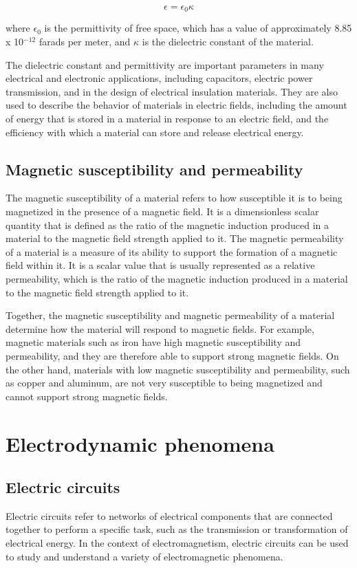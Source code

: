 \documentclass{article}
\begin{document}
$$\epsilon = \epsilon_0 \kappa$$

where $\epsilon_0$ is the permittivity of free space, which has a value of
approximately 8.85 x 10$^{-12}$ farads per meter, and $\kappa$ is the
dielectric constant of the material.

The dielectric constant and permittivity are important parameters in many
electrical and electronic applications, including capacitors, electric power
transmission, and in the design of electrical insulation materials. They are
also used to describe the behavior of materials in electric fields, including
the amount of energy that is stored in a material in response to an electric
field, and the efficiency with which a material can store and release
electrical energy.
\subsection{Magnetic susceptibility and permeability} %
\label{ssub:Magnetic susceptibility and permeability}
The magnetic susceptibility of a material refers to how susceptible it is to
being magnetized in the presence of a magnetic field. It is a dimensionless
scalar quantity that is defined as the ratio of the magnetic induction produced
in a material to the magnetic field strength applied to it. The magnetic
permeability of a material is a measure of its ability to support the formation
of a magnetic field within it. It is a scalar value that is usually represented
as a relative permeability, which is the ratio of the magnetic induction
produced in a material to the magnetic field strength applied to it.

Together, the magnetic susceptibility and magnetic permeability of a material
determine how the material will respond to magnetic fields. For example,
magnetic materials such as iron have high magnetic susceptibility and
permeability, and they are therefore able to support strong magnetic fields. On
the other hand, materials with low magnetic susceptibility and permeability,
such as copper and aluminum, are not very susceptible to being magnetized and
cannot support strong magnetic fields.

\section{Electrodynamic phenomena} %
\label{sec:Electrodynamic phenomena}
\subsection{Electric circuits} %
\label{ssub:Electric circuits}
Electric circuits refer to networks of electrical components that are connected
together to perform a specific task, such as the transmission or transformation
of electrical energy. In the context of electromagnetism, electric circuits can
be used to study and understand a variety of electromagnetic phenomena.
\end{document}
